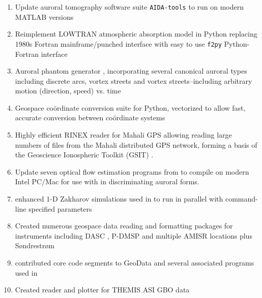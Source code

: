 \begin{enumerate}    
    \item Update auroral tomography software suite \texttt{AIDA-tools} \citep{aidatools} to run on modern MATLAB versions
    
    \item Reimplement LOWTRAN atmospheric absorption model in Python \citep{lowtran} replacing 1980s Fortran mainframe/punched interface \citep{lowtran7} with easy to use \texttt{f2py} Python-Fortran interface
    
    \item Auroral phantom generator \citep{cvphantom}, incorporating several canonical auroral types including discrete arcs, vortex streets and vortex streets--including arbitrary motion (direction, speed) vs. time
    
    \item Geospace coördinate conversion suite for Python, vectorized to allow fast, accurate conversion between coördinate systems \citep{pymap3d}
    
    \item Highly efficient RINEX reader for Mahali GPS \citep{pankratius2014,semeter2016,pankratius2016ams} allowing reading large numbers of files from the Mahali distributed GPS network, forming a basis of the Geoscience Ionospheric Toolkit (GSIT) \citep{gsit}.
    
    \item Update seven optical flow estimation programs \citep{barron1994code} from \citep{barron1994} to compile on modern Intel PC/Mac for use with \citep{cviono} in discriminating auroral forms.
    
    \item enhanced 1-D Zakharov simulations \citep{zakharov1d} used in \citep{akbari2015,akbari2016,akbaridis} to run in parallel with command-line specified parameters
    
    \item Created numerous geospace data reading and formatting packages for instruments including DASC \citep{dascutils}, P-DMSP \citep{meridianreader} and multiple AMISR locations plus Søndrestrøm \citep{isrutils}
    
    \item contributed core code segments to GeoData and several associated programs \citep{geodata} used in \citet{swoboda2015,swobodathesis}
    
    \item Created reader and plotter for THEMIS ASI GBO \citep{donovan2006} data \citep{hirschthemis}
\end{enumerate} 

    

